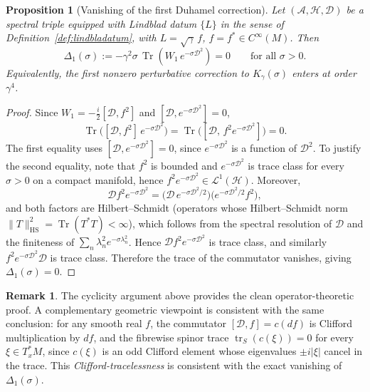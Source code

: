 \documentclass[11pt,a4paper]{article}
\numberwithin{equation}{section}
\newtheorem{Proposition}[Theorem]{Proposition}
\theoremstyle{definition}
\newtheorem{Remark}[Theorem]{Remark}
\newcommand{\cA}{\mathcal{A}}
\newcommand{\cH}{\mathcal{H}}
\newcommand{\cD}{\mathcal{D}}
\newcommand{\Tr}{\operatorname{Tr}}
\newcommand{\tr}{\operatorname{tr}}
\begin{document}
\begin{Proposition}[Vanishing of the first Duhamel correction]
\label{prop:vanishing}
Let $(\cA, \cH, \cD)$ be a spectral triple equipped with Lindblad datum
$\{L\}$ in the sense of Definition~\ref{def:lindbladatum}, with
$L = \sqrt{\gamma}\,f$, $f = f^* \in C^\infty(M)$. Then
\begin{equation}
  \Delta_1(\sigma) := -\gamma^2\sigma\,
  \Tr\!\left(W_1\,e^{-\sigma\cD^2}\right) = 0
  \qquad \text{for all } \sigma > 0.
\end{equation}
Equivalently, the first nonzero perturbative correction to
$K_\gamma(\sigma)$ enters at order $\gamma^4$.
\end{Proposition}

\begin{proof}
Since $W_1 = -\tfrac{i}{2}[\cD, f^2]$ and $[\cD, e^{-\sigma\cD^2}] = 0$,
\begin{equation}
  \Tr\bigl([\cD, f^2]\,e^{-\sigma\cD^2}\bigr)
  = \Tr\bigl([\cD,\, f^2 e^{-\sigma\cD^2}]\bigr) = 0.
\end{equation}
The first equality uses $[\cD,e^{-\sigma\cD^2}]=0$, since
$e^{-\sigma\cD^2}$ is a function of $\cD^2$. To justify the second
equality, note that $f^2$ is bounded and $e^{-\sigma\cD^2}$ is trace
class for every $\sigma>0$ on a compact manifold, hence
$f^2e^{-\sigma\cD^2}\in \mathcal{L}^1(\cH)$. Moreover,
\begin{equation}
\cD f^2 e^{-\sigma\cD^2}=
\bigl(\cD\,e^{-\sigma\cD^2/2}\bigr)\!\bigl(e^{-\sigma\cD^2/2}f^2\bigr),
\end{equation}
and both factors are Hilbert--Schmidt (operators whose Hilbert--Schmidt
norm $\|T\|_{\mathrm{HS}}^2=\Tr(T^*T)<\infty$), which follows from the
spectral resolution of $\cD$ and the finiteness of
$\sum_n \lambda_n^2 e^{-\sigma \lambda_n^2}$. Hence
$\cD f^2 e^{-\sigma\cD^2}$ is trace class, and similarly
$f^2e^{-\sigma\cD^2}\cD$ is trace class. Therefore the trace of the
commutator vanishes, giving $\Delta_1(\sigma)=0$.
\end{proof}

\begin{Remark}
The cyclicity argument above provides the clean operator-theoretic proof.
A complementary geometric viewpoint is consistent with the same conclusion:
for any smooth real $f$, the commutator $[\cD,f]=c(df)$ is Clifford
multiplication by $df$, and the fibrewise spinor trace $\tr_S(c(\xi))=0$
for every $\xi\in T_x^*M$, since $c(\xi)$ is an odd Clifford element
whose eigenvalues $\pm i|\xi|$ cancel in the trace. This
\emph{Clifford-tracelessness} is consistent with the exact vanishing
of $\Delta_1(\sigma)$.
\end{Remark}
\end{document}
